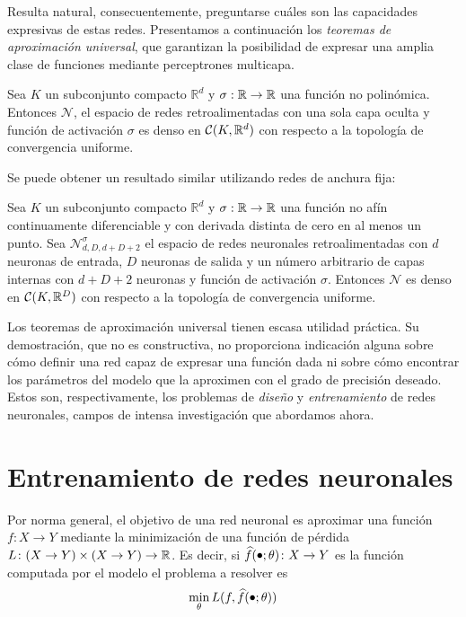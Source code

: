 Resulta natural, consecuentemente, preguntarse cuáles son las capacidades expresivas de estas redes. Presentamos a continuación los \textit{teoremas de aproximación universal}, que garantizan la posibilidad de expresar una amplia clase de funciones mediante perceptrones multicapa.
\begin{theorem}
Sea \( K \) un subconjunto compacto \( \mathbb{R}^d \) y  \( \sigma: \mathbb{R} \to \mathbb{R} \) una función no polinómica.  Entonces \( \mathcal{N} \), el espacio de redes retroalimentadas con una sola capa oculta y función de activación \( \sigma \)  es denso en \( \mathcal{C} (K, \mathbb{R}^{d}) \) con respecto a la topología de convergencia uniforme.
\end{theorem}

Se puede obtener un resultado similar utilizando redes de anchura fija:
\begin{theorem}
Sea \( K \) un subconjunto compacto \( \mathbb{R}^d \) y  \( \sigma: \mathbb{R} \to \mathbb{R} \) una función no afín continuamente diferenciable y con derivada distinta de cero en al menos un punto. Sea \( \mathcal{N}^\sigma_{d, D, d + D + 2} \) el espacio de redes neuronales retroalimentadas con \( d \) neuronas de entrada, \( D \) neuronas de salida y un número arbitrario de capas internas con \( d + D + 2\) neuronas y función de activación \( \sigma \). Entonces \( \mathcal{N} \) es denso en \( \mathcal{C} (K, \mathbb{R}^{D}) \) con respecto a la topología de convergencia uniforme.
\end{theorem}

Los teoremas de aproximación universal tienen escasa utilidad práctica. Su demostración, que no es constructiva, no proporciona indicación alguna sobre cómo definir una red capaz de expresar una función dada ni sobre cómo encontrar los parámetros del modelo que la aproximen con el grado de precisión deseado. Estos son, respectivamente, los problemas de \textit{diseño} y \textit{entrenamiento} de redes neuronales, campos de intensa investigación que abordamos ahora.

\section{Entrenamiento de redes neuronales}
Por norma general, el objetivo de una red neuronal es aproximar una función \( f \colon X \to Y  \) mediante la minimización de una función de pérdida \( L \colon (X \to Y) \times (X \to Y) \to \mathbb{R} \). Es decir, si \( \widehat{f}(\smallbullet; \theta) \colon X \to Y \) es la función computada por el modelo el problema a resolver es
\begin{equation}
    \min_\theta L(f, \widehat{f}(\smallbullet; \theta))
\end{equation}

